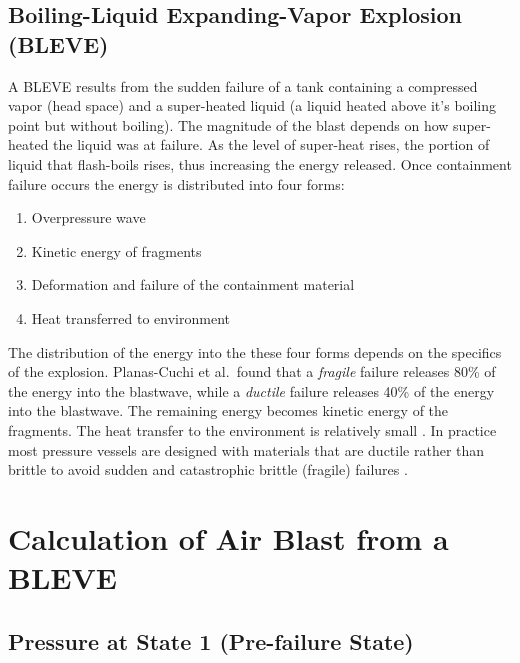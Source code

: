 \documentclass[10pt,parskip=half,
toc=sectionentrywithdots,
bibliography=totocnumbered,
captions=tableheading,numbers=noendperiod]{scrartcl}
\providecommand{\tightlist}{%
  \setlength{\itemsep}{0pt}\setlength{\parskip}{0pt}}
\begin{document}
\hypertarget{boiling-liquid-expanding-vapor-explosion-bleve}{%
\subsection{Boiling-Liquid Expanding-Vapor Explosion
(BLEVE)}\label{boiling-liquid-expanding-vapor-explosion-bleve}}

A BLEVE results from the sudden failure of a tank containing a
compressed vapor (head space) and a super-heated liquid (a liquid heated
above it's boiling point but without boiling). The magnitude of the
blast depends on how super-heated the liquid was at failure. As the
level of super-heat rises, the portion of liquid that flash-boils rises,
thus increasing the energy released. Once containment failure occurs the
energy is distributed into four forms:

\begin{enumerate}
\def\labelenumi{\arabic{enumi}.}
\tightlist
\item
  Overpressure wave
\item
  Kinetic energy of fragments
\item
  Deformation and failure of the containment material
\item
  Heat transferred to environment
\end{enumerate}

The distribution of the energy into the these four forms depends on the
specifics of the explosion. Planas-Cuchi et al.~found that a
\emph{fragile} failure releases 80\% of the energy into the blastwave,
while a \emph{ductile} failure releases 40\% of the energy into the
blastwave. The remaining energy becomes kinetic energy of the fragments.
The heat transfer to the environment is relatively small
\cite{Planas2004}. In practice most pressure vessels are designed with
materials that are ductile rather than brittle to avoid sudden and
catastrophic brittle (fragile) failures \cite{Benac2016}.

\hypertarget{calculation-of-air-blast-from-a-bleve}{%
\section{Calculation of Air Blast from a
BLEVE}\label{calculation-of-air-blast-from-a-bleve}}

\hypertarget{pressure-at-state-1-pre-failure-state}{%
\subsection{Pressure at State 1 (Pre-failure
State)}\label{pressure-at-state-1-pre-failure-state}}
\end{document}
